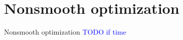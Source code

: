 
\section{Nonsmooth optimization}


\begin{frame}{Nonsmooth optimization}
    \textcolor{blue}{TODO if time}
\end{frame}
